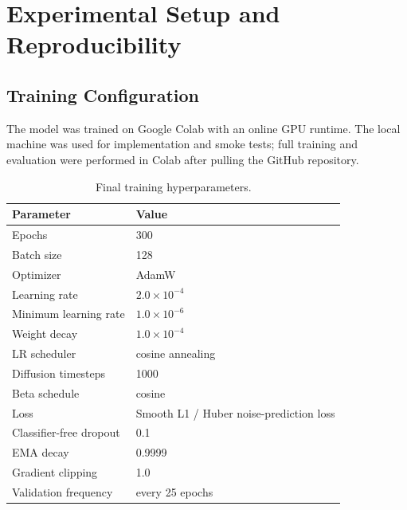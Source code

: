 \documentclass[12pt,a4paper]{article}
\makeatletter
\newcommand{\NeedReportSpace}[1]{%
    \par
    \begingroup
    \dimen@=#1\relax
    \ifdim\dimexpr\pagegoal-\pagetotal\relax<\dimen@
        \pagebreak
    \fi
    \endgroup
}
\makeatother
\begin{document}
\newpage

\section{Experimental Setup and Reproducibility}

\subsection{Training Configuration}

The model was trained on Google Colab with an online GPU runtime.  The local
machine was used for implementation and smoke tests; full training and
evaluation were performed in Colab after pulling the GitHub repository.

\NeedReportSpace{14\baselineskip}
\begin{table}[H]
    \centering
    \caption{Final training hyperparameters.}
    \label{tab:training_hyperparams}
    \renewcommand{\arraystretch}{1.2}
    \begin{tabular}{ll}
    \toprule
    \textbf{Parameter} & \textbf{Value} \\
    \midrule
    Epochs & 300 \\
    Batch size & 128 \\
    Optimizer & AdamW \\
    Learning rate & $2.0 \times 10^{-4}$ \\
    Minimum learning rate & $1.0 \times 10^{-6}$ \\
    Weight decay & $1.0 \times 10^{-4}$ \\
    LR scheduler & cosine annealing \\
    Diffusion timesteps & 1000 \\
    Beta schedule & cosine \\
    Loss & Smooth L1 / Huber noise-prediction loss \\
    Classifier-free dropout & 0.1 \\
    EMA decay & 0.9999 \\
    Gradient clipping & 1.0 \\
    Validation frequency & every 25 epochs \\
    \bottomrule
    \end{tabular}
\end{table}

\newpage
\end{document}
